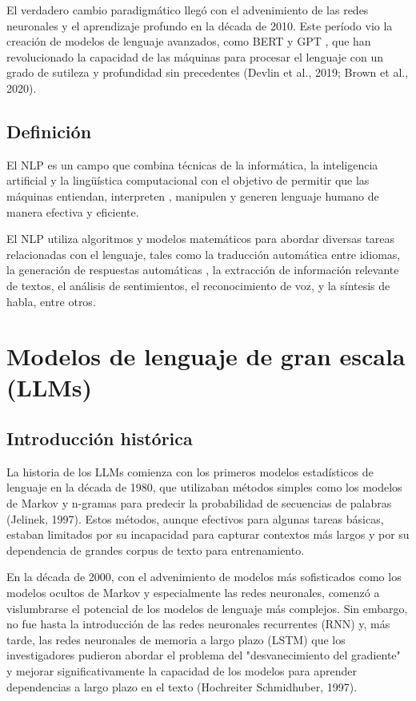 El verdadero cambio paradigmático llegó con el advenimiento de las redes neuronales y el aprendizaje profundo
en la década de 2010. Este período vio la creación de modelos de lenguaje avanzados, como BERT y GPT
, que han revolucionado la capacidad de las máquinas para procesar el lenguaje con un grado de sutileza y profundidad
sin precedentes (Devlin et al., 2019; Brown et al., 2020).

\subsection{Definición}
El NLP es un campo que combina técnicas de la informática, la inteligencia artificial y la lingüística computacional con
el objetivo de permitir que las máquinas entiendan, interpreten
, manipulen y generen lenguaje humano de manera efectiva y eficiente.

El NLP utiliza algoritmos y modelos matemáticos para abordar diversas tareas relacionadas con el lenguaje, tales como la
traducción automática entre idiomas, la generación de respuestas automáticas
, la extracción de información relevante de textos, el análisis de sentimientos, el reconocimiento de voz, y
la síntesis de habla, entre otros.


\section{Modelos de lenguaje de gran escala (LLMs)}

\subsection{Introducción histórica}
La historia de los LLMs comienza con los primeros modelos estadísticos de lenguaje en
la década de 1980, que utilizaban métodos simples como los modelos de Markov y n-gramas para predecir la probabilidad
de secuencias de palabras (Jelinek, 1997). Estos métodos, aunque efectivos para algunas tareas básicas,
estaban limitados por su incapacidad para capturar contextos más largos
y por su dependencia de grandes corpus de texto para entrenamiento.

En la década de 2000, con el advenimiento de modelos más sofisticados como los modelos ocultos de Markov
y especialmente las redes neuronales, comenzó a vislumbrarse el
potencial de los modelos de lenguaje más complejos. Sin embargo, no fue hasta la introducción de las redes neuronales
recurrentes (RNN) y, más tarde, las redes neuronales de memoria a largo plazo (LSTM)
que los investigadores pudieron abordar el problema del "desvanecimiento
del gradiente" y mejorar significativamente la capacidad de los
modelos para aprender dependencias a largo plazo en el texto (Hochreiter Schmidhuber, 1997).

